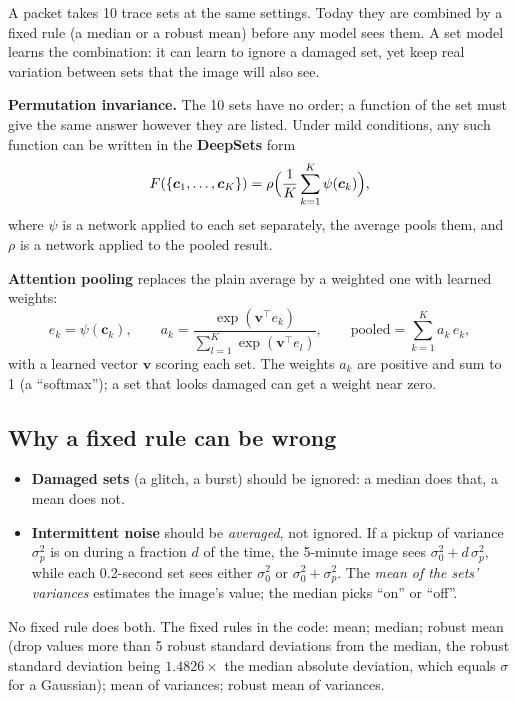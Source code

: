 \documentclass[11pt]{article}
\begin{document}
\begin{idea}
A packet takes 10 trace sets at the same settings. Today they are combined by a fixed rule (a median or a robust mean) before any
model sees them. A set model learns the combination: it can learn to ignore a damaged set, yet keep real variation between sets
that the image will also see.
\end{idea}

\begin{background}
\textbf{Permutation invariance.} The 10 sets have no order; a function of the set must give the same answer however they are
listed. Under mild conditions, any such function can be written in the \textbf{DeepSets} form
\begin{equation}
F(\{\bm c_1, \dots, \bm c_K\}) = \rho\Bigl(\frac1K\sum_{k=1}^{K}\psi(\bm c_k)\Bigr),
\end{equation}
where $\psi$ is a network applied to each set separately, the average pools them, and $\rho$ is a network applied to the pooled
result.

\textbf{Attention pooling} replaces the plain average by a weighted one with learned weights:
\begin{equation}
e_k = \psi(\bm c_k),\qquad a_k = \frac{\exp(\bm v^\top e_k)}{\sum_{l=1}^{K}\exp(\bm v^\top e_l)},\qquad \text{pooled} = \sum_{k=1}^{K}a_k\,e_k ,
\end{equation}
with a learned vector $\bm v$ scoring each set. The weights $a_k$ are positive and sum to 1 (a ``softmax''); a set that looks
damaged can get a weight near zero.
\end{background}

\subsection{Why a fixed rule can be wrong}
\begin{itemize}
\item \textbf{Damaged sets} (a glitch, a burst) should be ignored: a median does that, a mean does not.
\item \textbf{Intermittent noise} should be \emph{averaged}, not ignored. If a pickup of variance $\sigma_p^2$ is on during a fraction
  $d$ of the time, the 5-minute image sees $\sigma_0^2 + d\,\sigma_p^2$, while each 0.2-second set sees either $\sigma_0^2$ or
  $\sigma_0^2 + \sigma_p^2$. The \emph{mean of the sets' variances} estimates the image's value; the median picks ``on'' or
  ``off''.
\end{itemize}
No fixed rule does both. The fixed rules in the code: mean; median; robust mean (drop values more than 5 robust standard
deviations from the median, the robust standard deviation being $1.4826\times$ the median absolute deviation, which equals
$\sigma$ for a Gaussian); mean of variances; robust mean of variances.
\end{document}

